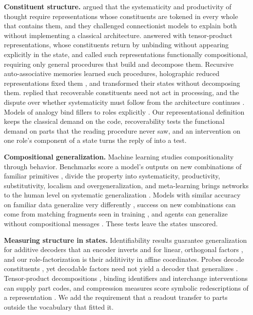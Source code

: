 \documentclass[10pt]{article}
\theoremstyle{plain}
\theoremstyle{remark}
\begin{document}
\textbf{Constituent structure.} \citet{fodor1988} argued that the systematicity and productivity of thought require representations whose constituents are tokened in every whole that contains them, and they challenged connectionist models to explain both without implementing a classical architecture. \citet{smolensky1987,smolensky1990} answered with tensor-product representations, whose constituents return by unbinding without appearing explicitly in the state, and \citet{vangelder1990} called such representations functionally compositional, requiring only general procedures that build and decompose them. Recursive auto-associative memories \citep{pollack1990} learned such procedures, holographic reduced representations fixed them \citep{plate1995}, and \citet{chalmers1990} transformed their states without decomposing them. \citet{fodor1990} replied that recoverable constituents need not act in processing, and the dispute over whether systematicity must follow from the architecture continues \citep{aizawa2003,quiltydunn2023,russin2024,woydt2025,goodale2026}. Models of analogy bind fillers to roles explicitly \citep{hummel1997,doumas2022}. Our representational definition keeps the classical demand on the code, recoverability tests the functional demand on parts that the reading procedure never saw, and an intervention on one role's component of a state turns the reply of \citet{fodor1990} into a test.

\textbf{Compositional generalization.} Machine learning studies compositionality through behavior. Benchmarks score a model's outputs on new combinations of familiar primitives \citep{lake2018,keysers2020,kim2020cogs}, \citet{hupkes2020} divide the property into systematicity, productivity, substitutivity, localism and overgeneralization, and meta-learning brings networks to the human level on systematic generalization \citep{lake2023}. Models with similar accuracy on familiar data generalize very differently \citep{mccoy2020berts}, success on new combinations can come from matching fragments seen in training \citep{dziri2023}, and agents can generalize without compositional messages \citep{chaabouni2020}. These tests leave the states unscored.

\textbf{Measuring structure in states.} Identifiability results guarantee generalization for additive decoders that an encoder inverts \citep{brady2023,lachapelle2023,wiedemer2024} and for linear, orthogonal factors \citep{uselis2026}, and our role-factorization is their additivity in affine coordinates. Probes decode constituents \citep{bernardi2020,redhardt2025}, yet decodable factors need not yield a decoder that generalizes \citep{montero2021,schott2022}. Tensor-product decompositions \citep{mccoy2019,soulos2020}, binding identifiers \citep{feng2024} and interchange interventions \citep{geiger2021,geiger2024das} can supply part codes, and compression measures score symbolic redescriptions of a representation \citep{elmoznino2024,elmoznino2026}. We add the requirement that a readout transfer to parts outside the vocabulary that fitted it.
\end{document}
